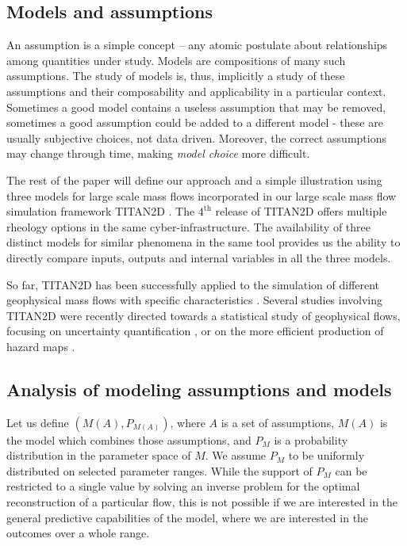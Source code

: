 \documentclass{article}
\begin{document}
\subsection{Models and assumptions}
An assumption is a simple concept -- any atomic postulate about relationships among quantities under study. Models are compositions of many such assumptions. The study of models is, thus, implicitly a study of these assumptions and their composability and applicability in a particular context. Sometimes a good model contains a useless assumption that may be removed, sometimes a good assumption could be added to a different model - these are usually subjective choices, not data driven. Moreover, the correct assumptions may change through time, making {\em model choice} more difficult.

The rest of the paper will define our approach and a simple illustration using three models for large scale mass flows incorporated in our large scale mass flow simulation framework  TITAN2D \citep{Patra2005,Patra2006, Yu2009, Aghakhani2016}. The $\mathrm{4^{\mathrm{th}}}$ release of TITAN2D offers multiple rheology options in the same cyber-infrastructure. The availability of three distinct models for similar phenomena in the same tool provides us the  ability to directly compare inputs, outputs and internal variables in all the three models.

So far, TITAN2D has been successfully applied to the simulation of different geophysical mass flows with specific characteristics \citep{Sheridan2005, Rupp2006, Norini2008, Charbonnier2009, Procter2010, Sheridan2010, Sulpizio2010, Capra2011}. Several studies involving TITAN2D were recently directed towards a statistical study of geophysical flows, focusing on uncertainty quantification \citep{Dalbey2008, Dalbey2009, Stefanescu2012b, Stefanescu2012a}, or on the more efficient production of hazard maps \citep{Bayarri2009, Spiller2014,Bayarri2015, Ogburn2016}.

\subsection{Analysis of modeling assumptions and models }
Let us define $\left(M(A), P_{M(A)}\right)$, where $A$ is a set of assumptions, $M(A)$ is the model which combines those assumptions, and $P_M$ is a probability distribution in the parameter space of $M$. We assume $P_M$ to be uniformly distributed on selected parameter ranges. While the support of $P_M$ can be restricted to a single value by solving an inverse problem for the optimal reconstruction of a particular flow, this is not possible if we are interested in the general predictive capabilities of the model, where we are interested in the outcomes over a whole range.
\end{document}
